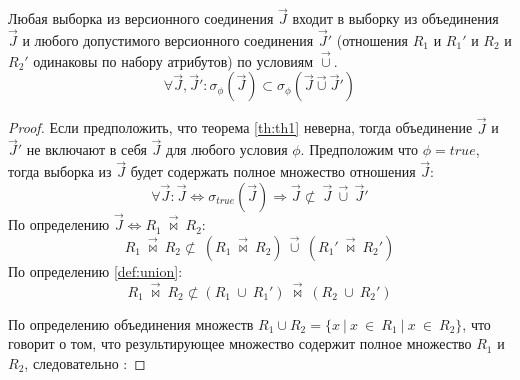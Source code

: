 \begin{theorem}
	\label{th:th1}
	Любая выборка из версионного соединения $\overrightarrow{J}$ входит в выборку из объединения $\overrightarrow{J}$ и любого допустимого версионного соединения $\overrightarrow{J}'$ (отношения $R_1$ и $R_1'$ и $R_2$ и $R_2'$ одинаковы по набору атрибутов) по условиям $\overrightarrow{\cup}$.
	\begin{equation}
		\forall \overrightarrow{J}, \overrightarrow{J}': \sigma_\phi(\overrightarrow{J}) \subset \sigma_\phi(\overrightarrow{J} \overrightarrow{\cup} \overrightarrow{J}')
	\end{equation}
\end{theorem}
\begin{proof}
	\indent Если предположить, что теорема \ref{th:th1} неверна, тогда объединение $\overrightarrow{J}$ и $\overrightarrow{J}'$ не включают в себя $\overrightarrow{J}$ для любого условия $\phi$.
	Предположим что $\phi = true$, тогда выборка из $\overrightarrow{J}$ будет содержать полное множество отношения $\overrightarrow{J}$:
	\begin{equation*}
		\label{eq:firstProof}
		\forall \overrightarrow{J}: \overrightarrow{J} \Leftrightarrow \sigma_{true}(\overrightarrow{J}) \Rightarrow \overrightarrow{J} \not\subset\ \overrightarrow{J}\ \overrightarrow{\cup}\ \overrightarrow{J}'
	\end{equation*}
	\indent По определению $\overrightarrow{J} \Leftrightarrow R_1\ \overrightarrow{\bowtie}\ R_2$:
	\begin{equation}
		R_1\ \overrightarrow{\bowtie}\ R_2 \not\subset\ (R_1\ \overrightarrow{\bowtie}\ R_2)\ \overrightarrow{\cup}\ (R_1'\ \overrightarrow{\bowtie}\ R_2')
	\end{equation}
	\indent По определению \ref{def:union}:
	\begin{equation}
		\label{eq:notsbset}
		R_1\ \overrightarrow{\bowtie}\ R_2 \not\subset (R_1\ \cup\ R_1')\ \overrightarrow{\bowtie}\ (R_2\ \cup\ R_2')
	\end{equation}
	
	\indent По определению объединения множеств $R_1 \cup R_2 = \{x~|~x~\in
	~R_1\ |\ x~\in~R_2\}$, что говорит о том, что результирующее множество содержит полное множество $R_1$ и $R_2$, следовательно :
	

\end{proof}
